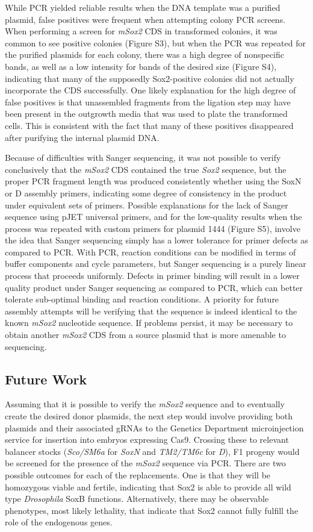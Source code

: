 \documentclass[withindex,glossary]{cam-thesis}
\begin{document}
While PCR yielded reliable results when the DNA template was a purified
plasmid, false positives were frequent when attempting colony PCR
screens. When performing a screen for \emph{mSox2} CDS in transformed
colonies, it was common to see positive colonies (Figure S3), but when
the PCR was repeated for the purified plasmids for each colony, there
was a high degree of nonspecific bands, as well as a low intensity for
bands of the desired size (Figure S4), indicating that many of the
supposedly Sox2-positive colonies did not actually incorporate the CDS
successfully. One likely explanation for the high degree of false
positives is that unassembled fragments from the ligation step may have
been present in the outgrowth media that was used to plate the
transformed cells. This is consistent with the fact that many of these
positives disappeared after purifying the internal plasmid DNA.

Because of difficulties with Sanger sequencing, it was not possible to
verify conclusively that the \emph{mSox2} CDS contained the true
\emph{Sox2} sequence, but the proper PCR fragment length was produced
consistently whether using the SoxN or D assembly primers, indicating
some degree of consistency in the product under equivalent sets of
primers. Possible explanations for the lack of Sanger sequence using
pJET universal primers, and for the low-quality results when the process
was repeated with custom primers for plasmid 1444 (Figure S5), involve
the idea that Sanger sequencing simply has a lower tolerance for primer
defects as compared to PCR. With PCR, reaction conditions can be
modified in terms of buffer components and cycle parameters, but Sanger
sequencing is a purely linear process that proceeds uniformly. Defects
in primer binding will result in a lower quality product under Sanger
sequencing as compared to PCR, which can better tolerate sub-optimal
binding and reaction conditions. A priority for future assembly attempts
will be verifying that the sequence is indeed identical to the known
\emph{mSox2} nucleotide sequence. If problems persist, it may be
necessary to obtain another \emph{mSox2} CDS from a source plasmid that
is more amenable to sequencing.

\subsection{Future Work}

Assuming that it is possible to verify the \emph{mSox2} sequence and to
eventually create the desired donor plasmids, the next step would
involve providing both plasmids and their associated gRNAs to the
Genetics Department microinjection service for insertion into embryos
expressing Cas9. Crossing these to relevant balancer stocks
(\emph{Sco/SM6a} for \emph{SoxN} and \emph{TM2/TM6c} for \emph{D}), F1
progeny would be screened for the presence of the \emph{mSox2} sequence
via PCR. There are two possible outcomes for each of the replacements.
One is that they will be homozygous viable and fertile, indicating that
Sox2 is able to provide all wild type \emph{Drosophila} SoxB functions.
Alternatively, there may be observable phenotypes, most likely
lethality, that indicate that Sox2 cannot fully fulfill the role of the
endogenous genes.
\end{document}
